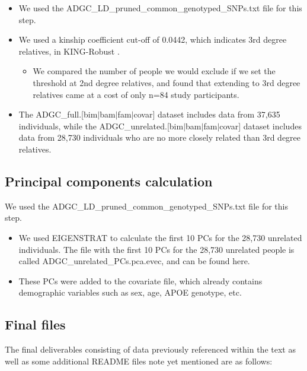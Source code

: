 \documentclass[12pt]{article}
\begin{document}
\begin{itemize}

\item We used the ADGC\_LD\_pruned\_common\_genotyped\_SNPs.txt file for this step.

\item We used a kinship coefficient cut-off of 0.0442, which indicates 3rd degree relatives, in KING-Robust \cite{king}.

\begin{itemize}
\item We compared the number of people we would exclude if we set the threshold at 2nd degree relatives, and found that extending to 3rd degree relatives came at a cost of only n=84 study participants.
\end{itemize}

\item The ADGC\_full.[bim$|$bam$|$fam$|$covar] dataset includes data from 37,635 individuals, while the ADGC\_unrelated.[bim$|$bam$|$fam$|$covar] dataset includes data from 28,730 individuals who are no more closely related than 3rd degree relatives.

\end{itemize}

\subsection{Principal components calculation}
We used the ADGC\_LD\_pruned\_common\_genotyped\_SNPs.txt file for this step.
\begin{itemize}
\item We used EIGENSTRAT \cite{price2006principal} to calculate the first 10 PCs for the 28,730 unrelated individuals. The file with the first 10 PCs for the 28,730 unrelated people is called ADGC\_unrelated\_PCs.pca.evec, and can be found here.

\item These PCs were added to the covariate file, which already contains demographic variables such as sex, age, APOE genotype, etc.

\end{itemize}

\subsection{Final files}

The final deliverables consisting of data previously referenced within the text as well as some additional README files note yet mentioned are as follows:
\end{document}

